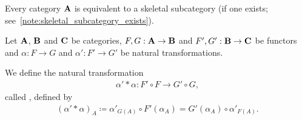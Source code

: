 \begin{proposition}\label{thm:skeletal_subcategory_equivalence}\cite[91]{MacLane1994}
  Every category $\operatorname{\mathbf{A}}$ is equivalent to a skeletal subcategory (if one exists; see~\cref{note:skeletal_subcategory_exists}).
\end{proposition}

\begin{definition}\label{def:natural_transformation_horizontal_composition}\cite[remarks 1.3.24]{Leinster2014}
  Let $\operatorname{\mathbf{A}}$, $\operatorname{\mathbf{B}}$ and $\operatorname{\mathbf{C}}$ be categories, $F, G: \operatorname{\mathbf{A}} \to \operatorname{\mathbf{B}}$ and $F', G': \operatorname{\mathbf{B}} \to \operatorname{\mathbf{C}}$ be functors and $\alpha: F \to G$ and $\alpha': F' \to G'$ be natural transformations.
  \begin{Center}
  \end{Center}

  We define the natural transformation
  \begin{align*}
    \alpha' * \alpha: F' \circ F \to G' \circ G,
  \end{align*}
  called , defined by
  \begin{align*}
    (\alpha' * \alpha)_A \coloneqq \alpha'_{G(A)} \circ F'(\alpha_A) = G'(\alpha_A) \circ \alpha'_{F(A)}.
  \end{align*}
\end{definition}

